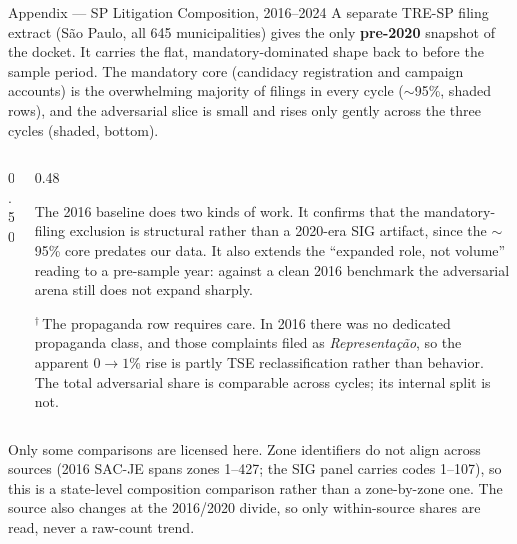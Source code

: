 

\begin{frame}{Appendix --- SP Litigation Composition, 2016--2024}
\hypertarget{app:sp2016}{}
\footnotesize
\noindent A separate TRE-SP filing extract (S\~{a}o Paulo, all 645 municipalities) gives the only \textbf{pre-2020} snapshot of the docket. It carries the flat, mandatory-dominated shape back to before the sample period. The mandatory core (candidacy registration and campaign accounts) is the overwhelming majority of filings in every cycle ($\sim$95\%, shaded rows), and the adversarial slice is small and rises only gently across the three cycles (shaded, bottom).
\smallskip
\begin{columns}[T]
\begin{column}{0.50\linewidth}
\centering
\resizebox{\linewidth}{!}{}
\end{column}
\begin{column}{0.48\linewidth}
{\scriptsize
The 2016 baseline does two kinds of work. It confirms that the mandatory-filing exclusion is structural rather than a 2020-era SIG artifact, since the $\sim$95\% core predates our data. It also extends the ``expanded role, not volume'' reading to a pre-sample year: against a clean 2016 benchmark the adversarial arena still does not expand sharply.\par
\smallskip
$^{\dagger}$\,The propaganda row requires care. In 2016 there was no dedicated propaganda class, and those complaints filed as \emph{Representa\c{c}\~{a}o}, so the apparent $0\to1\%$ rise is partly TSE reclassification rather than behavior. The total adversarial share is comparable across cycles; its internal split is not.\par}
\end{column}
\end{columns}
\smallskip
{\centering\scriptsize Only some comparisons are licensed here. Zone identifiers do not align across sources (2016 SAC-JE spans zones 1--427; the SIG panel carries codes 1--107), so this is a state-level composition comparison rather than a zone-by-zone one. The source also changes at the 2016/2020 divide, so only within-source shares are read, never a raw-count trend.\par}
\smallskip
\centerline{\hyperlink{app:recomp}{}\quad\hyperlink{src:motivation}{}}
\end{frame}
